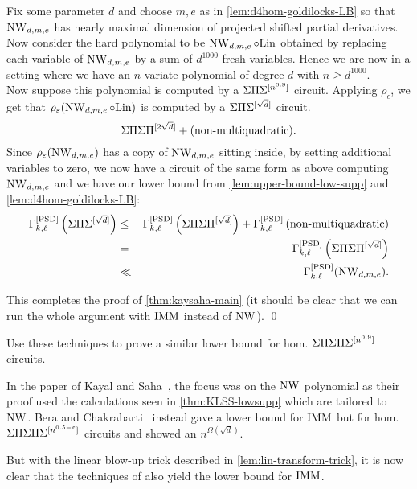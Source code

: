 Fix some parameter $d$ and choose $m,e$ as in \autoref{lem:d4hom-goldilocks-LB} so that $\operatorname{\mathrm{NW}}_{d,m,e}$ has nearly maximal dimension of projected shifted partial derivatives. Now consider the hard polynomial to be $\operatorname{\mathrm{NW}}_{d,m,e} \circ \mathrm{Lin}$ obtained by replacing each variable of $\operatorname{\mathrm{NW}}_{d,m,e}$ by a sum of $d^{1000}$ fresh variables. Hence we are now in a setting where we have an $n$-variate polynomial of degree $d$ with $n \geq d^{1000}$. \\

Now suppose this polynomial is computed by a $\Sigma\Pi\Sigma^{[n^{0.9}]}$ circuit. Applying $\rho_\epsilon$, we get that $\rho_\varepsilon(\operatorname{\mathrm{NW}}_{d,m,e} \circ \mathrm{Lin})$ is computed by a $\Sigma\Pi\Sigma^{[\sqrt{d}]}$ circuit.  
\[
\Sigma\Pi\Sigma\Pi^{[2\sqrt{d}]} + (\text{non-multiquadratic}).
\]
Since $\rho_\varepsilon(\operatorname{\mathrm{NW}}_{d,m,e})$ has a copy of $\operatorname{\mathrm{NW}}_{d,m,e}$ sitting inside, by setting additional variables to zero, we now have a circuit of the same form as above computing $\operatorname{\mathrm{NW}}_{d,m,e}$ and we have our lower bound from \autoref{lem:upper-bound-low-supp} and \autoref{lem:d4hom-goldilocks-LB}:
\begin{eqnarray*}
\Gamma^{\mathrm{[PSD]}}_{k,\ell}\left(\Sigma\Pi\Sigma^{[\sqrt{d}]}\right) & \leq& \Gamma^{\mathrm{[PSD]}}_{k,\ell}\left(\Sigma\Pi\Sigma\Pi^{[\sqrt{d}]}\right) + \Gamma^{\mathrm{[PSD]}}_{k,\ell}\left(\text{non-multiquadratic}\right) \\
& = & \Gamma^{\mathrm{[PSD]}}_{k,\ell}\left(\Sigma\Pi\Sigma\Pi^{[\sqrt{d}]}\right)\\
&\ll &\Gamma^{\mathrm{[PSD]}}_{k,\ell}(\operatorname{\mathrm{NW}}_{d,m,e}). 
\end{eqnarray*}

This completes the proof of \autoref{thm:kaysaha-main} (it should be clear that we can run the whole argument with $\operatorname{\mathrm{IMM}}$ instead of $\operatorname{\mathrm{NW}}$). \qed

\begin{exercise}
Use these techniques to prove a similar lower bound for hom. $\Sigma\Pi\Sigma\Pi\Sigma^{[n^{0.9}]}$ circuits. 
\end{exercise}


\begin{remark*}
In the paper of Kayal and Saha~\cite{KayalSaha14}, the focus was on the $\operatorname{\mathrm{NW}}$ polynomial as their proof used the calculations seen in \autoref{thm:KLSS-lowsupp} which are tailored to $\operatorname{\mathrm{NW}}$. 
Bera and Chakrabarti~\cite{BC15} instead gave a lower bound for $\operatorname{\mathrm{IMM}}$ but for hom. $\Sigma\Pi\Sigma\Pi\Sigma^{[n^{0.5 - \varepsilon}]}$ circuits and showed an $n^{\Omega(\sqrt{d})}$.

But with the linear blow-up trick described in \autoref{lem:lin-transform-trick}, it is now clear that the techniques of \cite{KayalSaha14} also yield the lower bound for $\operatorname{\mathrm{IMM}}$. 
\end{remark*}

